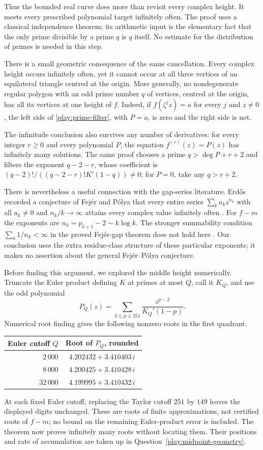 Thus the bounded real curve does more than revisit every complex
height.  It meets every prescribed polynomial target infinitely
often.  The proof uses a classical independence theorem; its
arithmetic input is the elementary fact that the only prime divisible
by a prime $q$ is $q$ itself. No estimate for the distribution of primes is
needed in this step.

There is a small geometric consequence of the same cancellation.
Every complex height occurs infinitely often, yet it cannot occur
at all three vertices of an equilateral triangle centred at the
origin.  More generally, no nondegenerate regular polygon with an
odd prime number $q$ of vertices, centred at the origin, has all its
vertices at one height of $f$.  Indeed, if $f(\zeta^jz)=a$ for
every $j$ and $z\ne0$, the left side of
\eqref{play:prime-filter}, with $P=a$, is zero and the right side
is not.

The infinitude conclusion also survives any number of derivatives:
for every integer $r\ge0$ and every polynomial $P$, the equation
$f^{(r)}(z)=P(z)$ has infinitely many solutions.  The same proof
chooses a prime $q>\deg P+r+2$ and filters the exponent
$q-2-r$, whose coefficient is
$(q-2)!/((q-2-r)!K'(1-q))\ne0$; for $P=0$, take any
$q>r+2$.

There is nevertheless a useful connection with the gap-series
literature.  Erd\H{o}s recorded a conjecture of Fej\'er and P\'olya
that every entire series $\sum_k a_kz^{n_k}$ with all $a_k\ne0$
and $n_k/k\to\infty$ attains every complex value infinitely
often \cite[Section IV.8, p.~250]{playErdos1961}.
For $f-m$ the exponents are $n_k=p_{k+1}-2\sim k\log k$.
The stronger summability condition $\sum_k1/n_k<\infty$ in the
proved Fej\'er-gap theorem does not hold here
\cite[Section 1]{playMurai1983}.
Our conclusion uses the extra residue-class structure of these
particular exponents; it makes no assertion about the general
Fej\'er--P\'olya conjecture.

Before finding this argument, we explored the middle height
numerically.  Truncate the Euler product defining $K$
at primes at most $Q$, call it $K_Q$, and use the odd polynomial
\[
 P_Q(z)=\sum_{3\le p\le251}\frac{z^{p-2}}{K_Q'(1-p)}.
\]
Numerical root finding gives the following nonzero roots in the
first quadrant.
\begin{center}
\begin{tabular}{rc}
\toprule
Euler cutoff $Q$ & Root of $P_Q$, rounded\tabularnewline
\midrule
$2\,000$  & $4.202432+3.410403\,i$\tabularnewline
$8\,000$  & $4.200425+3.410428\,i$\tabularnewline
$32\,000$ & $4.199995+3.410432\,i$\tabularnewline
\bottomrule
\end{tabular}
\end{center}
At each fixed Euler cutoff, replacing the Taylor cutoff $251$ by
$149$ leaves the displayed digits unchanged.  These are roots of
finite approximations, not certified roots of $f-m$; no bound on
the remaining Euler-product error is included.  The theorem now
proves infinitely many roots without locating them.  Their positions
and rate of accumulation are taken up in
Question~\ref{play:midpoint-geometry}.

